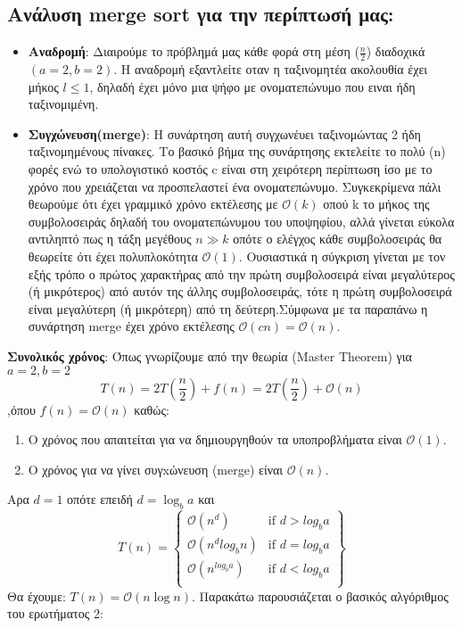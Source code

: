 \documentclass[a4paper]{article}
\begin{document}
\subsection*{Ανάλυση merge sort για την περίπτωσή μας:}
\begin{itemize}
\item\textbf{Αναδρομή}: Διαιρούμε το πρόβλημά μας κάθε φορά στη μέση ($\frac{n}{2}$) διαδοχικά $(a=2,b=2)$. Η αναδρομή εξαντλείτε  οταν η ταξινομητέα ακολουθία έχει μήκος $l\leq1$, δηλαδή έχει μόνο μια ψήφο με ονοματεπώνυμο που ειναι ήδη ταξινομιμένη.
\item \textbf{Συγχώνευση(merge)}: Η συνάρτηση αυτή συγχωνέυει ταξινομώντας 2 ήδη ταξινομημένους πίνακες. Το βασικό βήμα της συνάρτησης εκτελείτε το πολύ (n) φορές ενώ το υπολογιστικό κοστός c είναι στη χειρότερη περίπτωση ίσο με το χρόνο που χρειάζεται να προσπελαστεί ένα ονοματεπώνυμο. Συγκεκρίμενα πάλι θεωρούμε ότι έχει γραμμικό χρόνο εκτέλεσης με $\mathcal{O}(k)$ οπού k το μήκος της συμβολοσειράς δηλαδή του ονοματεπώνυμου του υποψηφίου, αλλά γίνεται εύκολα αντιληπτό πως η τάξη μεγέθους $n\gg k$ οπότε ο ελέγχος κάθε συμβολοσειράς  θα θεωρείτε ότι έχει πολυπλοκότητα  $\mathcal{O}(1)$. Ουσιαστικά η σύγκριση γίνεται με τον εξής τρόπο ο πρώτος χαρακτήρας από την πρώτη συμβολοσειρά είναι μεγαλύτερος (ή μικρότερος) από αυτόν της άλλης συμβολοσειράς, τότε η πρώτη συμβολοσειρά είναι μεγαλύτερη (ή μικρότερη) από τη δεύτερη.Σύμφωνα με τα παραπάνω η συνάρτηση merge έχει χρόνο εκτέλεσης \textbf{$\mathcal{O}(cn)=\mathcal{O}(n)$}.
\end{itemize}
\textbf{Συνολικός χρόνος}: Όπως γνωρίζουμε από την θεωρία (Master Theorem) για $a=2,b=2$ $$T(n)=2T(\frac{n}{2})+f(n)=2T(\frac{n}{2})+\mathcal{O}(n)$$,όπου $f(n)=\mathcal{O}(n)$ καθώς:
\begin{enumerate}
\item Ο χρόνος που απαιτείται για να δημιουργηθούν τα υποπροβλήματα είναι $\mathcal{O}(1)$.
\item Ο χρόνος για να γίνει συγxώνευση (merge) είναι $\mathcal{O}(n)$.
\end{enumerate}
Aρα $d=1$ οπότε επειδή $d=\log_b{a}$ και 
$$T(n)=
\left\{\begin{array}{lr}
\mathcal{O}(n^d)          & \text{if } d>log_b{a}\\
\mathcal{O}(n^dlog_b{n})  & \text{if } d=log_b{a}\\
\mathcal{O}(n^{log_b{a}}) & \text{if } d<log_b{a}\\
\end{array}\right\}$$
Θα έχουμε: $T(n)=\mathcal{O}(n\log{n})$. Παρακάτω παρουσιάζεται ο βασικός αλγόριθμος του ερωτήματος 2: 
\end{document}
